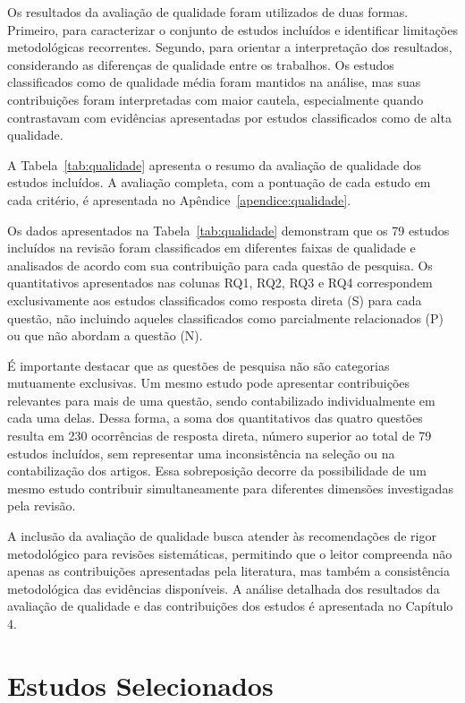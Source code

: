Os resultados da avaliação de qualidade foram utilizados de duas formas. Primeiro, para caracterizar o conjunto de estudos incluídos e identificar limitações metodológicas recorrentes. Segundo, para orientar a interpretação dos resultados, considerando as diferenças de qualidade entre os trabalhos. Os estudos classificados como de qualidade média foram mantidos na análise, mas suas contribuições foram interpretadas com maior cautela, especialmente quando contrastavam com evidências apresentadas por estudos classificados como de alta qualidade.

A Tabela~\ref{tab:qualidade} apresenta o resumo da avaliação de qualidade dos estudos incluídos. A avaliação completa, com a pontuação de cada estudo em cada critério, é apresentada no Apêndice~\ref{apendice:qualidade}.



Os dados apresentados na Tabela~\ref{tab:qualidade} demonstram que os 79 estudos incluídos na revisão foram classificados em diferentes faixas de qualidade e analisados de acordo com sua contribuição para cada questão de pesquisa. Os quantitativos apresentados nas colunas RQ1, RQ2, RQ3 e RQ4 correspondem exclusivamente aos estudos classificados como resposta direta (S) para cada questão, não incluindo aqueles classificados como parcialmente relacionados (P) ou que não abordam a questão (N).

É importante destacar que as questões de pesquisa não são categorias mutuamente exclusivas. Um mesmo estudo pode apresentar contribuições relevantes para mais de uma questão, sendo contabilizado individualmente em cada uma delas. Dessa forma, a soma dos quantitativos das quatro questões resulta em 230 ocorrências de resposta direta, número superior ao total de 79 estudos incluídos, sem representar uma inconsistência na seleção ou na contabilização dos artigos. Essa sobreposição decorre da possibilidade de um mesmo estudo contribuir simultaneamente para diferentes dimensões investigadas pela revisão.

A inclusão da avaliação de qualidade busca atender às recomendações de rigor metodológico para revisões sistemáticas, permitindo que o leitor compreenda não apenas as contribuições apresentadas pela literatura, mas também a consistência metodológica das evidências disponíveis. A análise detalhada dos resultados da avaliação de qualidade e das contribuições dos estudos é apresentada no Capítulo 4.

\section{Estudos Selecionados}

